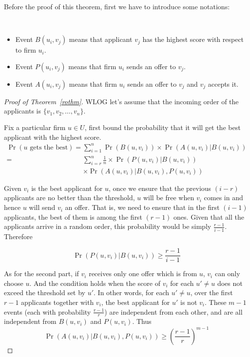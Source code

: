 Before the proof of this theorem, first we have to introduce some notations:
\begin{notation}\label{events}
    \ \\
\begin{itemize}
    \item Event $B(u_i, v_j)$ means that applicant $v_j$
        has the highest score with respect to firm $u_i$.
    \item Event $P(u_i, v_j)$ means that firm $u_i$ sends
        an offer to $v_j$.
    \item Event $A(u_i, v_j)$ means that firm $u_i$ sends
        an offer to $v_j$ and $v_j$ accepts it.
\end{itemize}

\end{notation}
\begin{proof}[Proof of Theorem~\ref{rothm}]
    WLOG let's assume that the incoming order of the applicants is
    $\{v_1, v_2, \dots, v_n\}$.

    Fix a particular firm $u \in U$,
    first bound the probability that it will get the best applicant
    with the highest score.
    \begin{align*}
        \Pr(u\text{ gets the best}) = &\sum_{i=1}^{n} \Pr(B(u, v_i)) \times \Pr(A(u, v_i)|B(u, v_i)) \\
                                = &\sum_{i=r}^{n} \frac{1}{n} \times \Pr(P(u, v_i)|B(u, v_i)) \\
                        & \times \Pr(A(u, v_i)|B(u, v_i),P(u, v_i))
    \end{align*}

    Given $v_i$ is the best applicant for $u$,
    once we ensure that the previous $(i-r)$ applicants are
    no better than the threshold, $u$ will be free when $v_i$ comes in
    and hence $u$ will send $v_i$ an offer.
    That is, we need to ensure that in the first $(i-1)$ applicants,
    the best of them is among the first $(r-1)$ ones.
    Given that all the applicants arrive in a random order,
    this probability would be simply $\frac{r-1}{i-1}$.
    Therefore

    $$\Pr(P(u, v_i) | B(u, v_i)) \ge \frac{r-1}{i-1}$$



    As for the second part,
    if $v_i$ receives only one offer which is from $u$,
    $v_i$ can only choose $u$.
    And the condition holds when the score of $v_i$
    for each $u' \neq u$ does not exceed the threshold set by $u'$.
    In other words, for each $u' \neq u$, over the first $r-1$ applicants together with $v_i$,
    the best applicant for $u'$ is not $v_i$.
    These $m-1$ events (each with probability $\frac{r-1}{r}$) are independent from each other,
    and are all independent from $B(u, v_i)$ and $P(u, v_i)$.
    Thus
    $$\Pr(A(u, v_i)|B(u, v_i), P(u, v_i)) \ge \left(\frac{r-1}{r}\right)^{m-1}$$


\end{proof}
